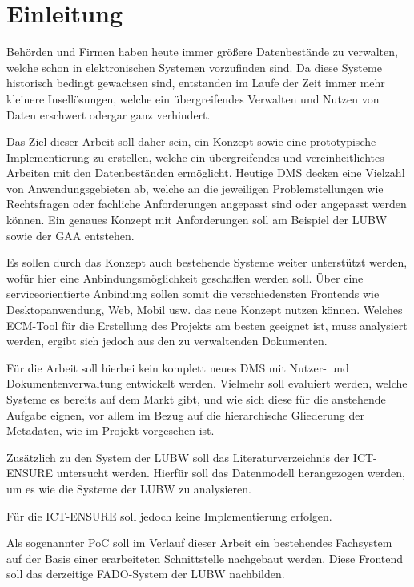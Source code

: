 \section{Einleitung} \label{Einfuehrung}
Beh\"orden und Firmen haben heute immer gr\"o\ss{}ere Datenbest\"ande zu verwalten, welche schon in elektronischen Systemen vorzufinden sind. Da diese Systeme historisch bedingt gewachsen sind, entstanden im Laufe der Zeit immer mehr kleinere Insell\"osungen, welche ein \"ubergreifendes Verwalten und Nutzen von Daten erschwert odergar ganz verhindert.

Das Ziel dieser Arbeit soll daher sein, ein Konzept sowie eine prototypische Implementierung zu erstellen, welche ein \"ubergreifendes und vereinheitlichtes Arbeiten mit den Datenbest\"anden erm\"oglicht. Heutige \ac{DMS} decken eine Vielzahl von Anwendungsgebieten ab, welche an die jeweiligen Problemstellungen wie Rechtsfragen oder fachliche Anforderungen angepasst sind oder angepasst werden k\"onnen.
Ein genaues Konzept mit Anforderungen soll am Beispiel der \ac{LUBW} sowie der \ac{GAA} entstehen.
\cite{Dokumenten-Management}

Es sollen durch das Konzept auch bestehende Systeme weiter unterst\"utzt werden, wof\"ur hier eine Anbindungsm\"oglichkeit geschaffen werden soll. \"Uber eine serviceorientierte Anbindung sollen somit die verschiedensten Frontends wie Desktopanwendung, Web, Mobil usw. das neue Konzept nutzen k\"onnen. Welches \ac{ECM}-Tool f\"ur die Erstellung des Projekts am besten geeignet ist, muss analysiert werden, ergibt sich jedoch aus den zu verwaltenden Dokumenten.

F\"ur die Arbeit soll hierbei kein komplett neues \ac{DMS} mit Nutzer- und Dokumentenverwaltung entwickelt werden. Vielmehr soll evaluiert werden, welche Systeme es bereits auf dem Markt gibt, und wie sich diese f\"ur die anstehende Aufgabe eignen, vor allem im Bezug auf die hierarchische Gliederung der Metadaten, wie im Projekt vorgesehen ist. 

Zus\"atzlich zu den System der \ac{LUBW} soll das Literaturverzeichnis der \ac{ICT-ENSURE} untersucht werden. Hierf\"ur soll das Datenmodell herangezogen werden, um es wie die Systeme der \ac{LUBW} zu analysieren. 

F\"ur die \ac{ICT-ENSURE} soll jedoch keine Implementierung erfolgen.

Als sogenannter \ac{PoC} soll im Verlauf dieser Arbeit ein bestehendes Fachsystem auf der Basis einer erarbeiteten Schnittstelle nachgebaut werden. Diese Frontend soll das derzeitige \ac{FADO}-System der \ac{LUBW} nachbilden.